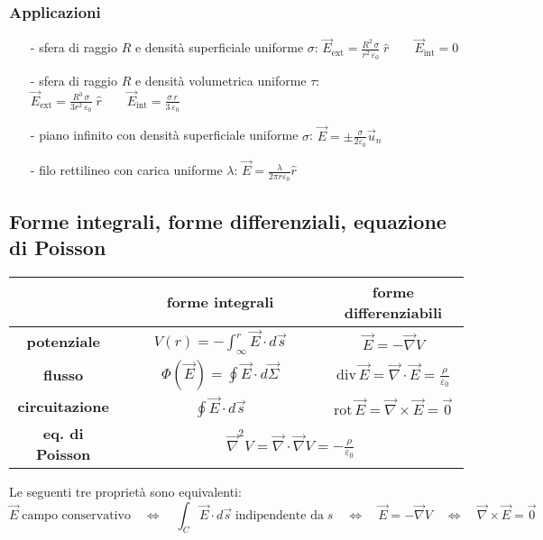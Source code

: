 \documentclass[a4paper]{article}
\newcommand\un{\vec{u}_n}
\newcommand\nab{\vec{\nabla}} %
\begin{document}
\subsubsection*{Applicazioni}
\begin{itemize}[topsep=3pt, itemsep=0pt]
	\item[-] sfera di raggio \(R\) e densità superficiale uniforme \(\sigma\): \(\displaystyle \vec{E}_\text{ext} = \frac{R^2 \, \sigma}{r^2 \, \varepsilon_0} \; \hat{r} \qquad \vec{E}_\text{int} = 0\)
	\item[-] sfera di raggio \(R\) e densità volumetrica uniforme \(\tau\): \(\displaystyle \vec{E}_\text{ext} = \frac{R^3 \, \sigma}{3 r^2 \, \varepsilon_0} \; \hat{r} \qquad \vec{E}_\text{int} = \frac{\sigma \, r}{3 \, \varepsilon_0}\)
	\item[-] piano infinito con densità superficiale uniforme \(\sigma\): \(\displaystyle \vec{E} = \pm \frac{\sigma}{2 \varepsilon_0} \un\)
	\item[-] filo rettilineo con carica uniforme \(\lambda\): \(\displaystyle \vec{E} = \frac{\lambda}{2 \pi r \varepsilon_0} \hat{r}\)
\end{itemize}

\subsection{Forme integrali, forme differenziali, equazione di Poisson}
\begin{center}
	\def\arraystretch{2.5}
	\begin{tabular}{c c c}
		& \textbf{forme integrali} & \textbf{forme differenziabili} \\
		\toprule
		\textbf{potenziale} & \(\displaystyle \qquad V(r) = - \int_\infty^r \vec{E} \cdot d\vec{s} \qquad\) & \(\displaystyle \vec{E} = - \nab V\) \\[7pt]
		\hline
		\textbf{flusso} & \(\displaystyle \qquad \Phi(\vec{E}) = \oint \vec{E} \cdot d\vec{\Sigma} \qquad\) & \(\displaystyle \text{div} \, \vec{E} = \nab \cdot \vec{E} = \frac{\rho}{\varepsilon_0}\) \\[7pt]
		\hline
		\textbf{circuitazione} & \(\displaystyle \qquad \oint \vec{E} \cdot d\vec{s} \qquad\) & \(\displaystyle \text{rot} \, \vec{E} = \nab \times \vec{E} = \vec{0}\) \\[7pt]
		\bottomrule
		\bottomrule
		\textbf{eq. di Poisson} & \multicolumn{2}{c}{\(\displaystyle \nab^2 V = \nab \cdot \nab V = - \frac{\rho}{\varepsilon_0}\)} \\
		\bottomrule
	\end{tabular}
\end{center}
Le seguenti tre proprietà sono equivalenti:
\[\vec{E} \; \text{campo conservativo} \quad \Leftrightarrow \quad \int_C \vec{E} \cdot d\vec{s} \; \text{indipendente da} \; s \quad \Leftrightarrow \quad \vec{E} = - \nab V \quad \Leftrightarrow \quad \nab \times \vec{E} = \vec{0}\]
\end{document}
